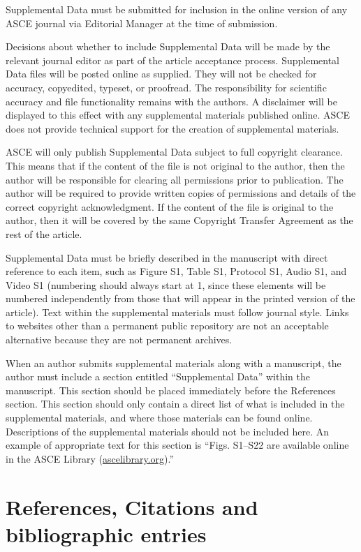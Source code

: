 \documentclass[Journal,letterpaper]{ascelike-new}
\begin{document}
Supplemental Data must be submitted for inclusion in the online version of any ASCE journal via Editorial Manager at the time of submission.

Decisions about whether to include Supplemental Data will be made by the relevant journal editor as part of the article acceptance process. Supplemental Data files will be posted online as supplied. They will not be checked for accuracy, copyedited, typeset, or proofread. The responsibility for scientific accuracy and file functionality remains with the authors. A disclaimer will be displayed to this effect with any supplemental materials published online. ASCE does not provide technical support for the creation of supplemental materials.

ASCE will only publish Supplemental Data subject to full copyright clearance. This means that if the content of the file is not original to the author, then the author will be responsible for clearing all permissions prior to publication. The author will be required to provide written copies of permissions and details of the correct copyright acknowledgment. If the content of the file is original to the author, then it will be covered by the same Copyright Transfer Agreement as the rest of the article.

Supplemental Data must be briefly described in the manuscript with direct reference to each item, such as Figure S1, Table S1, Protocol S1, Audio S1, and Video S1 (numbering should always start at 1, since these elements will be numbered independently from those that will appear in the printed version of the article). Text within the supplemental materials must follow journal style. Links to websites other than a permanent public repository are not an acceptable alternative because they are not permanent archives.

When an author submits supplemental materials along with a manuscript, the author must include a section entitled ``Supplemental Data'' within the manuscript. This section should be placed immediately before the References section. This section should only contain a direct list of what is included in the supplemental materials, and where those materials can be found online. Descriptions of the supplemental materials should not be included here. An example of appropriate text for this section is ``Figs. S1–S22 are available online in the ASCE Library (\href{http://ascelibrary.org/}{ascelibrary.org}).''

\section{References, Citations and bibliographic entries}
\end{document}
